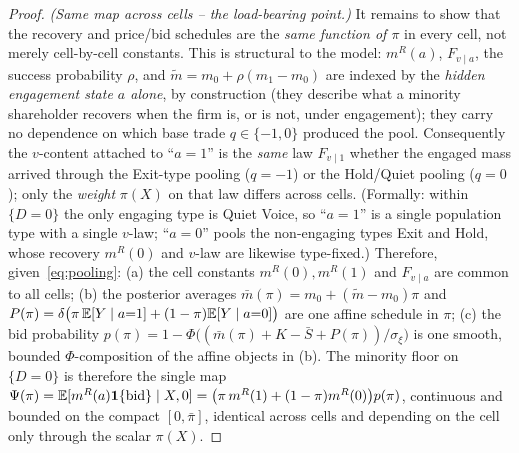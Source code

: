 \begin{proof}
\emph{(Same map across cells -- the load-bearing point.)} It remains to show
that the recovery and price/bid schedules are the \emph{same function of $\pi$}
in every cell, not merely cell-by-cell constants. This is structural to the
model: $m^{R}(a)$, $F_{v\mid a}$, the success probability $\rho$, and
$\tilde m=m_0+\rho(m_1-m_0)$ are indexed by the \emph{hidden engagement state
$a$ alone}, by construction (they describe what a minority shareholder recovers
when the firm is, or is not, under engagement); they carry no dependence on
which base trade $q\in\{-1,0\}$ produced the pool. Consequently the
$v$-content attached to ``$a=1$'' is the \emph{same} law $F_{v\mid 1}$ whether
the engaged mass arrived through the Exit-type pooling ($q=-1$) or the Hold/Quiet
pooling ($q=0$); only the \emph{weight} $\pi(X)$ on that law differs across
cells. (Formally: within $\{D=0\}$ the only engaging type is Quiet Voice, so
``$a=1$'' is a single population type with a single $v$-law; ``$a=0$'' pools the
non-engaging types Exit and Hold, whose recovery $m^{R}(0)$ and $v$-law are
likewise type-fixed.) Therefore, given~\eqref{eq:pooling}: (a) the cell
constants $m^{R}(0),m^{R}(1)$ and $F_{v\mid a}$ are common to all cells; (b) the
posterior averages $\bar m(\pi)=m_0+(\tilde m-m_0)\pi$ and
$P(\pi)=\delta\bigl(\pi\,\mathbb{E}[Y\mid a{=}1]+(1-\pi)\mathbb{E}[Y\mid a{=}0]\bigr)$ are one
affine schedule in $\pi$; (c) the bid probability
$p(\pi)=1-\Phi\bigl((\bar m(\pi)+K-\bar S+P(\pi))/\sigma_\xi\bigr)$ is one
smooth, bounded $\Phi$-composition of the affine objects in (b). The minority
floor on $\{D=0\}$ is therefore the single map
$\Psi(\pi)=\mathbb{E}[m^{R}(a)\mathbf{1}\{\text{bid}\}\mid X,0]
=\bigl(\pi\,m^{R}(1)+(1-\pi)m^{R}(0)\bigr)p(\pi)$, continuous and bounded on the
compact $[0,\bar\pi]$, identical across cells and depending on the cell only
through the scalar $\pi(X)$.
\end{proof}


